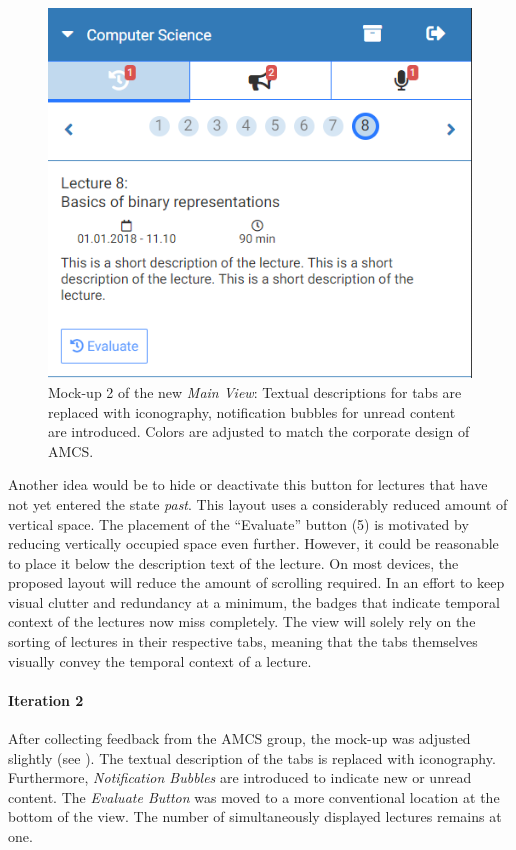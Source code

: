 \begin{figure}
	\vspace*{-0.5cm}
	\begin{center}
		\includegraphics[width=.48\textwidth]{mockups/main_view_enhancement_v2_cropped.png}
	\end{center}
	\captionsetup{format=plain}
	\caption{Mock-up 2 of the new \emph{Main View}:
		Textual descriptions for tabs are replaced with iconography, notification
		bubbles for unread content are introduced. Colors are adjusted to match the corporate design of AMCS.
	}
	\label{figure:mainviewenhancement2}
	\vspace*{-0.5cm}
\end{figure}
Another idea would be to hide or deactivate this button for lectures that have not yet entered the state \emph{past}. This layout uses a considerably reduced amount of vertical space.
The placement of the “Evaluate” button (5) is motivated by reducing vertically occupied space even further. However, it could be reasonable to place it below the description text of the lecture. On most devices, the proposed layout will reduce the amount of scrolling required. In an effort to keep visual clutter and redundancy at a minimum, the badges that indicate temporal context of the lectures now miss completely.
The view will solely rely on the sorting of lectures in their respective tabs, meaning that the tabs themselves visually convey the temporal context of a lecture.
\paragraph{Iteration 2}
After collecting feedback from the AMCS group, the mock-up was adjusted slightly (see ). The textual description of the tabs is replaced with iconography. Furthermore, \emph{Notification Bubbles} are introduced to indicate new or unread content. The \emph{Evaluate Button} was moved to a more conventional location at the bottom of the view. The number of simultaneously displayed lectures remains at one.
